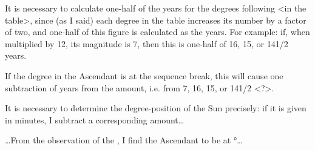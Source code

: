 It is necessary to calculate one-half of the years for the degrees following <in the table>, since (as I said) each degree in the table increases its number by a factor of two, and one-half of this figure is calculated as the years. For example: if, when multiplied by 12, its magnitude is 7, then this is one-half of 16, 15, or 141/2 years. 

If the degree in the Ascendant is at the sequence break, this will cause one subtraction of years from the amount, i.e. from 7, 16, 15, or 141/2 <?>.

It is necessary to determine the degree-position of the Sun precisely: if it is given in minutes, I subtract a corresponding amount…

…From the observation of the \Sun, I find the Ascendant to be at °…

\newpage